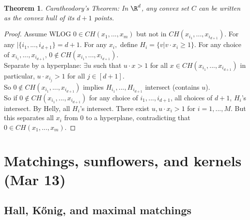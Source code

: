 \documentclass[a4paper]{article}
\newtheorem{thm}{Theorem}[section]
\begin{document}
\begin{thm}
    Caratheodory's Theorem: In $\R^d$, any convex set $C$ can be written as the convex hull of its $d+1$ points. 
\end{thm}
\begin{proof}
    Assume WLOG $0\in CH(x_1,...,x_m)$ but not in $CH(x_{i_1},...,x_{i_{d+1}})$. For any $| \{i_1,...,i_{d+1}\}=d+1$. For any $x_i,$ define $H_i= \{v| v\cdot x_i\geq 1\}$. For any choice of $x_{i_1},...,x_{i_{d+1}}$, $0\notin CH(x_{i_1},...,x_{i_{d+1}})$. \\
    Separate by a hyperplane: $\exists u$ such that $u\cdot x>1$ for all $x\in CH(x_{i_1},...,x_{i_{d+1}})$ in particular, $u\cdot x_{i_j}>1$ for all $j\in [d+1]$. \\
    So $0\notin CH(x_{i_1},...,x_{i_{d+1}})$ implies $H_{i_1},...,H_{i_{d+1}}$ intersect (contains $u$). \\
    So if $0\notin CH(x_{i_1},...,x_{i_{d+1}})$ for any choice of $i_1,...,i_{d+1}$, all choices of $d+1$, $H_i$'s intersect. By Helly, all $H_i$'s intersect. There exist $u, u\cdot x_i>1$ for $i=1,...,M$. But this separates all $x_i$ from $0$ to a hyperplane, contradicting that $0\in CH(x_1,...,x_m)$. 
\end{proof}
\newpage
\section{Matchings, sunflowers, and kernels (Mar 13)}

\subsection{Hall, K\H{o}nig, and maximal matchings}
\end{document}

